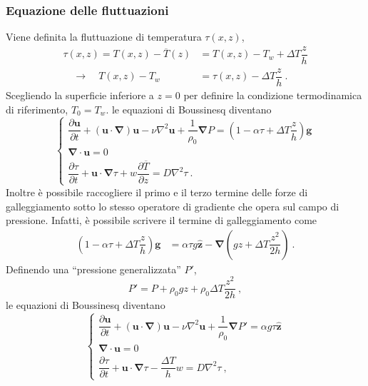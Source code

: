 \documentclass{article}
\begin{document}
\subsubsection{Equazione delle fluttuazioni}
Viene definita la fluttuazione di temperatura $\tau(x,z)$,
\begin{equation}
\begin{aligned}
    \tau(x,z) = T(x,z) - \overline{T}(z) & = T(x,z) - T_w + \Delta T \dfrac{z}{h} \\
    \quad \rightarrow \quad T(x,z) - T_w & = \tau(x,z) - \Delta T \dfrac{z}{h} \ .
\end{aligned}
\end{equation}
Scegliendo la superficie inferiore a $z = 0$ per definire la condizione termodinamica di riferimento, $T_0 = T_w$.
le equazioni di Boussinesq diventano
\begin{equation}
    \begin{cases}
      \dfrac{\partial \bm{u}}{\partial t} + 
      \left( \bm{u} \cdot \bm{\nabla} \right) \bm{u} -
      \nu \nabla^2 \bm{u} + \dfrac{1}{\rho_0}\bm{\nabla} P = \left( 1 - \alpha \tau + \Delta T \dfrac{z}{h} \right) \bm{g} \\
      \bm{\nabla} \cdot \bm{u} = 0 \\
      \dfrac{\partial \tau}{\partial t} + \bm{u} \cdot 
      \bm{\nabla} \tau + w \dfrac{\partial \overline{T}}{\partial z}=  D \nabla^2 \tau \ .
    \end{cases}
\end{equation}
Inoltre è possibile raccogliere il primo e il terzo termine delle forze di galleggiamento sotto lo stesso operatore di gradiente che opera sul campo di pressione. Infatti, è possibile scrivere il termine di galleggiamento come
\begin{equation}
\begin{aligned}
    \left( 1 - \alpha \tau + \Delta T \dfrac{z}{h} \right) \bm{g} & = \alpha \tau g \bm{\hat{z}} - \bm{\nabla} \left( gz + \Delta T \dfrac{z^2}{2 h} \right) \ .
\end{aligned}
\end{equation}
Definendo una ``pressione generalizzata'' $P'$,
\begin{equation}
    P' = P + \rho_0 g z + \rho_0 \Delta T \dfrac{z^2}{2 h} \ ,
\end{equation}
le equazioni di Boussinesq diventano
\begin{equation}\label{eqn:Bouss-tau}
    \begin{cases}
      \dfrac{\partial \bm{u}}{\partial t} + 
      \left( \bm{u} \cdot \bm{\nabla} \right) \bm{u} -
      \nu \nabla^2 \bm{u} + \dfrac{1}{\rho_0}\bm{\nabla} P' = \alpha  g \tau \bm{\hat{z}} \\
      \bm{\nabla} \cdot \bm{u} = 0 \\
      \dfrac{\partial \tau}{\partial t} + \bm{u} \cdot 
      \bm{\nabla} \tau -\dfrac{\Delta T}{h} w =  D \nabla^2 \tau \ ,
    \end{cases}
\end{equation}
\end{document}
